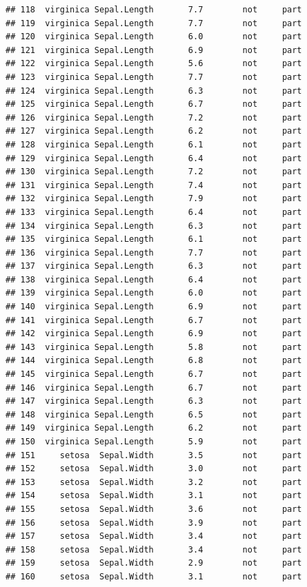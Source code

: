 \documentclass[krantz2]{krantz}\usepackage{knitr}%
\begin{document}
\begin{knitrout}
\begin{kframe}
\begin{verbatim}
## 118  virginica Sepal.Length       7.7        not     part
## 119  virginica Sepal.Length       7.7        not     part
## 120  virginica Sepal.Length       6.0        not     part
## 121  virginica Sepal.Length       6.9        not     part
## 122  virginica Sepal.Length       5.6        not     part
## 123  virginica Sepal.Length       7.7        not     part
## 124  virginica Sepal.Length       6.3        not     part
## 125  virginica Sepal.Length       6.7        not     part
## 126  virginica Sepal.Length       7.2        not     part
## 127  virginica Sepal.Length       6.2        not     part
## 128  virginica Sepal.Length       6.1        not     part
## 129  virginica Sepal.Length       6.4        not     part
## 130  virginica Sepal.Length       7.2        not     part
## 131  virginica Sepal.Length       7.4        not     part
## 132  virginica Sepal.Length       7.9        not     part
## 133  virginica Sepal.Length       6.4        not     part
## 134  virginica Sepal.Length       6.3        not     part
## 135  virginica Sepal.Length       6.1        not     part
## 136  virginica Sepal.Length       7.7        not     part
## 137  virginica Sepal.Length       6.3        not     part
## 138  virginica Sepal.Length       6.4        not     part
## 139  virginica Sepal.Length       6.0        not     part
## 140  virginica Sepal.Length       6.9        not     part
## 141  virginica Sepal.Length       6.7        not     part
## 142  virginica Sepal.Length       6.9        not     part
## 143  virginica Sepal.Length       5.8        not     part
## 144  virginica Sepal.Length       6.8        not     part
## 145  virginica Sepal.Length       6.7        not     part
## 146  virginica Sepal.Length       6.7        not     part
## 147  virginica Sepal.Length       6.3        not     part
## 148  virginica Sepal.Length       6.5        not     part
## 149  virginica Sepal.Length       6.2        not     part
## 150  virginica Sepal.Length       5.9        not     part
## 151     setosa  Sepal.Width       3.5        not     part
## 152     setosa  Sepal.Width       3.0        not     part
## 153     setosa  Sepal.Width       3.2        not     part
## 154     setosa  Sepal.Width       3.1        not     part
## 155     setosa  Sepal.Width       3.6        not     part
## 156     setosa  Sepal.Width       3.9        not     part
## 157     setosa  Sepal.Width       3.4        not     part
## 158     setosa  Sepal.Width       3.4        not     part
## 159     setosa  Sepal.Width       2.9        not     part
## 160     setosa  Sepal.Width       3.1        not     part

\end{verbatim}
\end{kframe}
\end{knitrout}
\end{document}
